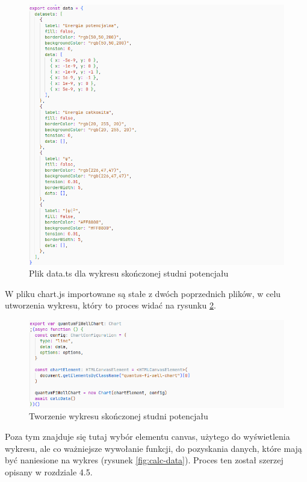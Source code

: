 \documentclass{SGGW-thesis}
\begin{document}
	\begin{figure}[H]
	\includegraphics[width=\textwidth,height=\textheight,keepaspectratio]{data.png} 
	\caption{Plik data.ts dla wykresu skończonej studni potencjału}
	\label{fig:data.ts}
	\end{figure}
	
	W pliku chart.js importowane są stałe z dwóch poprzednich plików, w celu utworzenia wykresu, który to proces widać na rysunku \ref{fig:new-chart}. 
	
	\begin{figure}[H]
	\includegraphics[width=\textwidth,height=\textheight,keepaspectratio]{new chart.png} 
	\caption{Tworzenie wykresu skończonej studni potencjału}
	\label{fig:new-chart}
	\end{figure}
	
	Poza tym znajduje się tutaj wybór elementu canvas, użytego do wyświetlenia wykresu, ale co ważniejsze wywołanie funkcji, do pozyskania danych, które mają być naniesione na wykres (rysunek \ref{fig:calc-data}). Proces ten został szerzej opisany w rozdziale 4.5. 
	
\end{document}
